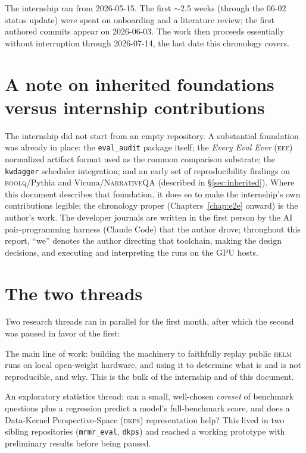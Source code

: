 \documentclass[11pt]{report}
\newcommand{\eeeshort}{\textsc{eee}\xspace}
\newcommand{\code}[1]{\texttt{#1}}
\newcommand{\file}[1]{\texttt{#1}}
\begin{document}
The internship ran from 2026-05-15. The first $\sim$2.5 weeks (through the 06-02
status update) were spent on onboarding and a literature review; the first
authored commits appear on 2026-06-03. The work then proceeds essentially without
interruption through 2026-07-14, the last date this chronology covers.

\section{A note on inherited foundations versus internship contributions}

The internship did not start from an empty repository. A substantial foundation
was already in place: the \file{eval\_audit} package itself; the \emph{Every Eval
Ever} (\eeeshort) normalized artifact format used as the common comparison
substrate; the \code{kwdagger} scheduler integration; and an early set of
reproducibility findings on \textsc{boolq}/Pythia and Vicuna/\textsc{NarrativeQA}
(described in \S\ref{sec:inherited}). Where this document describes that
foundation, it does so to make the internship's own contributions legible; the
chronology proper (Chapters~\ref{chap:e2e} onward) is the author's work. The
developer journals are written in the first person by the AI pair-programming
harness (Claude Code) that the author drove; throughout this report, ``we'' denotes
the author directing that toolchain, making the design decisions, and executing and
interpreting the runs on the GPU hosts.

\section{The two threads}

Two research threads ran in parallel for the first month, after which the second
was paused in favor of the first:

\begin{description}[style=nextline,leftmargin=1.5em]
  \item[Thread A --- \textsc{helm} reproduction (Chapters \ref{chap:framing}--\ref{chap:reporting}).]
    The main line of work: building the machinery to faithfully replay public
    \textsc{helm} runs on local open-weight hardware, and using it to determine
    what is and is not reproducible, and why. This is the bulk of the internship
    and of this document.
  \item[Thread B --- efficient benchmarking (Chapter \ref{chap:effbench}).]
    An exploratory statistics thread: can a small, well-chosen \emph{coreset} of
    benchmark questions plus a regression predict a model's full-benchmark score,
    and does a Data-Kernel Perspective-Space (\textsc{dkps}) representation help?
    This lived in two sibling repositories (\file{mrmr\_eval}, \file{dkps}) and
    reached a working prototype with preliminary results before being paused.
\end{description}
\end{document}
